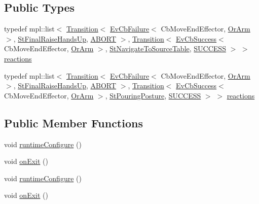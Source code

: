 \subsection*{Public Types}
\begin{DoxyCompactItemize}
\item 
typedef mpl\+::list$<$ \hyperlink{classsmacc_1_1Transition}{Transition}$<$ \hyperlink{structsmacc_1_1EvCbFailure}{Ev\+Cb\+Failure}$<$ Cb\+Move\+End\+Effector, \hyperlink{classsm__fetch__two__table__whiskey__pour_1_1OrArm}{Or\+Arm} $>$, \hyperlink{structsm__fetch__two__table__whiskey__pour_1_1StFinalRaiseHandsUp}{St\+Final\+Raise\+Hands\+Up}, \hyperlink{structsmacc_1_1default__transition__tags_1_1ABORT}{A\+B\+O\+RT} $>$, \hyperlink{classsmacc_1_1Transition}{Transition}$<$ \hyperlink{structsmacc_1_1EvCbSuccess}{Ev\+Cb\+Success}$<$ Cb\+Move\+End\+Effector, \hyperlink{classsm__fetch__two__table__whiskey__pour_1_1OrArm}{Or\+Arm} $>$, \hyperlink{structsm__fetch__two__table__whiskey__pour_1_1StNavigateToSourceTable}{St\+Navigate\+To\+Source\+Table}, \hyperlink{structsmacc_1_1default__transition__tags_1_1SUCCESS}{S\+U\+C\+C\+E\+SS} $>$ $>$ \hyperlink{structsm__fetch__two__table__whiskey__pour_1_1StInitialPosture_ab03c2d4761715a726806196990af59f9}{reactions}
\item 
typedef mpl\+::list$<$ \hyperlink{classsmacc_1_1Transition}{Transition}$<$ \hyperlink{structsmacc_1_1EvCbFailure}{Ev\+Cb\+Failure}$<$ Cb\+Move\+End\+Effector, \hyperlink{classsm__fetch__two__table__whiskey__pour_1_1OrArm}{Or\+Arm} $>$, \hyperlink{structsm__fetch__two__table__whiskey__pour_1_1StFinalRaiseHandsUp}{St\+Final\+Raise\+Hands\+Up}, \hyperlink{structsmacc_1_1default__transition__tags_1_1ABORT}{A\+B\+O\+RT} $>$, \hyperlink{classsmacc_1_1Transition}{Transition}$<$ \hyperlink{structsmacc_1_1EvCbSuccess}{Ev\+Cb\+Success}$<$ Cb\+Move\+End\+Effector, \hyperlink{classsm__fetch__two__table__whiskey__pour_1_1OrArm}{Or\+Arm} $>$, \hyperlink{structsm__fetch__two__table__whiskey__pour_1_1StPouringPosture}{St\+Pouring\+Posture}, \hyperlink{structsmacc_1_1default__transition__tags_1_1SUCCESS}{S\+U\+C\+C\+E\+SS} $>$ $>$ \hyperlink{structsm__fetch__two__table__whiskey__pour_1_1StInitialPosture_aa7a16dbbb5b7c323c0afd3713b0e97e9}{reactions}
\end{DoxyCompactItemize}
\subsection*{Public Member Functions}
\begin{DoxyCompactItemize}
\item 
void \hyperlink{structsm__fetch__two__table__whiskey__pour_1_1StInitialPosture_a9f7fd5f9ef906709bee03449e75f2903}{runtime\+Configure} ()
\item 
void \hyperlink{structsm__fetch__two__table__whiskey__pour_1_1StInitialPosture_a897a32b3c45edc11da22241828925ca4}{on\+Exit} ()
\item 
void \hyperlink{structsm__fetch__two__table__whiskey__pour_1_1StInitialPosture_a9f7fd5f9ef906709bee03449e75f2903}{runtime\+Configure} ()
\item 
void \hyperlink{structsm__fetch__two__table__whiskey__pour_1_1StInitialPosture_a897a32b3c45edc11da22241828925ca4}{on\+Exit} ()
\end{DoxyCompactItemize}

